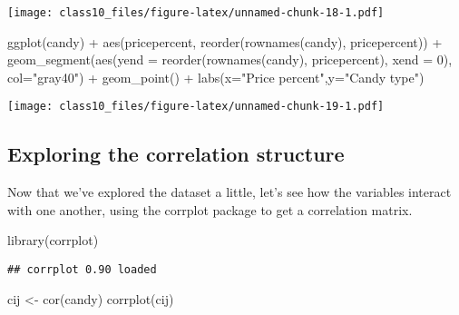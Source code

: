\documentclass[
]{article}
\newenvironment{Shaded}{\begin{snugshade}}{\end{snugshade}}
\newcommand{\AttributeTok}[1]{\textcolor[rgb]{0.77,0.63,0.00}{#1}}
\newcommand{\DecValTok}[1]{\textcolor[rgb]{0.00,0.00,0.81}{#1}}
\newcommand{\FunctionTok}[1]{\textcolor[rgb]{0.00,0.00,0.00}{#1}}
\newcommand{\NormalTok}[1]{#1}
\newcommand{\OtherTok}[1]{\textcolor[rgb]{0.56,0.35,0.01}{#1}}
\newcommand{\SpecialCharTok}[1]{\textcolor[rgb]{0.00,0.00,0.00}{#1}}
\newcommand{\StringTok}[1]{\textcolor[rgb]{0.31,0.60,0.02}{#1}}
\begin{document}
\texttt{[image: class10\_files/figure-latex/unnamed-chunk-18-1.pdf]}

\begin{Shaded}
\begin{Highlighting}[]
\FunctionTok{ggplot}\NormalTok{(candy) }\SpecialCharTok{+}
  \FunctionTok{aes}\NormalTok{(pricepercent, }\FunctionTok{reorder}\NormalTok{(}\FunctionTok{rownames}\NormalTok{(candy), pricepercent)) }\SpecialCharTok{+}
  \FunctionTok{geom\_segment}\NormalTok{(}\FunctionTok{aes}\NormalTok{(}\AttributeTok{yend =} \FunctionTok{reorder}\NormalTok{(}\FunctionTok{rownames}\NormalTok{(candy), pricepercent), }\AttributeTok{xend =} \DecValTok{0}\NormalTok{), }\AttributeTok{col=}\StringTok{"gray40"}\NormalTok{) }\SpecialCharTok{+}
    \FunctionTok{geom\_point}\NormalTok{() }\SpecialCharTok{+} \FunctionTok{labs}\NormalTok{(}\AttributeTok{x=}\StringTok{"Price percent"}\NormalTok{,}\AttributeTok{y=}\StringTok{"Candy type"}\NormalTok{)}
\end{Highlighting}
\end{Shaded}

\texttt{[image: class10\_files/figure-latex/unnamed-chunk-19-1.pdf]}

\hypertarget{exploring-the-correlation-structure}{%
\subsection{Exploring the correlation
structure}\label{exploring-the-correlation-structure}}

Now that we've explored the dataset a little, let's see how the
variables interact with one another, using the corrplot package to get a
correlation matrix.

\begin{Shaded}
\begin{Highlighting}[]
\FunctionTok{library}\NormalTok{(corrplot)}
\end{Highlighting}
\end{Shaded}

\begin{verbatim}
## corrplot 0.90 loaded
\end{verbatim}

\begin{Shaded}
\begin{Highlighting}[]
\NormalTok{cij }\OtherTok{\textless{}{-}} \FunctionTok{cor}\NormalTok{(candy)}
\FunctionTok{corrplot}\NormalTok{(cij)}
\end{Highlighting}
\end{Shaded}
\end{document}

